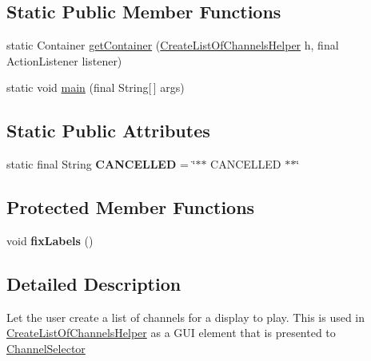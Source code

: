 \subsection*{Static Public Member Functions}
\begin{DoxyCompactItemize}
\item 
static Container \hyperlink{classgov_1_1fnal_1_1ppd_1_1dd_1_1channel_1_1list_1_1CreateListOfChannels_a8a0dc66827626a2c196a42054873d1ae}{get\-Container} (\hyperlink{classgov_1_1fnal_1_1ppd_1_1dd_1_1channel_1_1list_1_1CreateListOfChannelsHelper}{Create\-List\-Of\-Channels\-Helper} h, final Action\-Listener listener)
\item 
static void \hyperlink{classgov_1_1fnal_1_1ppd_1_1dd_1_1channel_1_1list_1_1CreateListOfChannels_ac88c04e3076b13d8d15091caf3f87d3e}{main} (final String\mbox{[}$\,$\mbox{]} args)
\end{DoxyCompactItemize}
\subsection*{Static Public Attributes}
\begin{DoxyCompactItemize}
\item 
\hypertarget{classgov_1_1fnal_1_1ppd_1_1dd_1_1channel_1_1list_1_1CreateListOfChannels_a0eefced0aa80da149689c678803811f2}{static final String {\bfseries C\-A\-N\-C\-E\-L\-L\-E\-D} = \char`\"{}$\ast$$\ast$ C\-A\-N\-C\-E\-L\-L\-E\-D $\ast$$\ast$\char`\"{}}\label{classgov_1_1fnal_1_1ppd_1_1dd_1_1channel_1_1list_1_1CreateListOfChannels_a0eefced0aa80da149689c678803811f2}

\end{DoxyCompactItemize}
\subsection*{Protected Member Functions}
\begin{DoxyCompactItemize}
\item 
\hypertarget{classgov_1_1fnal_1_1ppd_1_1dd_1_1channel_1_1list_1_1CreateListOfChannels_a4695872a3a161e89f65876fef35a15cf}{void {\bfseries fix\-Labels} ()}\label{classgov_1_1fnal_1_1ppd_1_1dd_1_1channel_1_1list_1_1CreateListOfChannels_a4695872a3a161e89f65876fef35a15cf}

\end{DoxyCompactItemize}


\subsection{Detailed Description}
Let the user create a list of channels for a display to play. This is used in \hyperlink{classgov_1_1fnal_1_1ppd_1_1dd_1_1channel_1_1list_1_1CreateListOfChannelsHelper}{Create\-List\-Of\-Channels\-Helper} as a G\-U\-I element that is presented to \hyperlink{classgov_1_1fnal_1_1ppd_1_1dd_1_1ChannelSelector}{Channel\-Selector}

